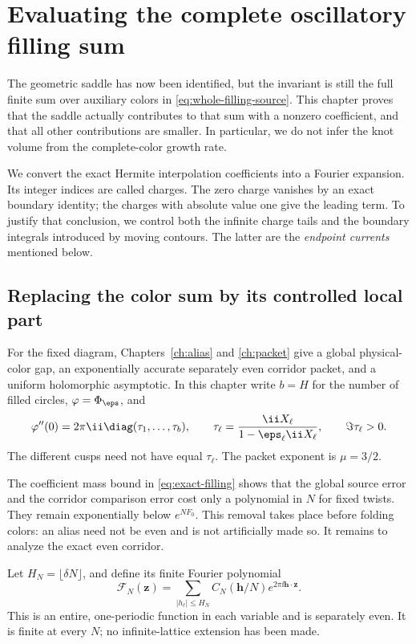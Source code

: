 \chapter{Evaluating the complete oscillatory filling sum}\label{ch:filling}

The geometric saddle has now been identified, but the invariant is still the full finite sum over auxiliary colors in \eqref{eq:whole-filling-source}. This chapter proves that the saddle actually contributes to that sum with a nonzero coefficient, and that all other contributions are smaller. In particular, we do not infer the knot volume from the complete-color growth rate.

We convert the exact Hermite interpolation coefficients into a Fourier expansion. Its integer indices are called charges. The zero charge vanishes by an exact boundary identity; the charges with absolute value one give the leading term. To justify that conclusion, we control both the infinite charge tails and the boundary integrals introduced by moving contours. The latter are the \emph{endpoint currents} mentioned below.

\section{Replacing the color sum by its controlled local part}
For the fixed diagram, Chapters~\ref{ch:alias} and \ref{ch:packet} give a global physical-color gap, an exponentially accurate separately even corridor packet, and a uniform holomorphic asymptotic. In this chapter write $b=H$ for the number of filled circles, $\varphi=\Phi_\eps$, and
\[
 \varphi''(0)=2\pi\ii\diag(\tau_1,\ldots,\tau_b),\qquad
 \tau_\ell=\frac{\ii X_\ell}{1-\eps_\ell\ii X_\ell},\qquad
 \Im\tau_\ell>0.
\]
The different cusps need not have equal $\tau_\ell$. The packet exponent is $\mu=3/2$.

The coefficient mass bound in \eqref{eq:exact-filling} shows that the global source error and the corridor comparison error cost only a polynomial in $N$ for fixed twists. They remain exponentially below $e^{NF_0}$. This removal takes place before folding colors: an alias need not be even and is not artificially made so. It remains to analyze the exact even corridor.

Let $H_N=\lfloor\delta N\rfloor$, and define its finite Fourier polynomial
\begin{equation}\label{eq:finite-Fourier}
 \mathcal F_N(\mathbf z)=
 \sum_{|h_\ell|\le H_N}C_N(\mathbf h/N)
 e^{2\pi\ii\mathbf h\cdot\mathbf z}.
\end{equation}
This is an entire, one-periodic function in each variable and is separately even. It is finite at every $N$; no infinite-lattice extension has been made.

